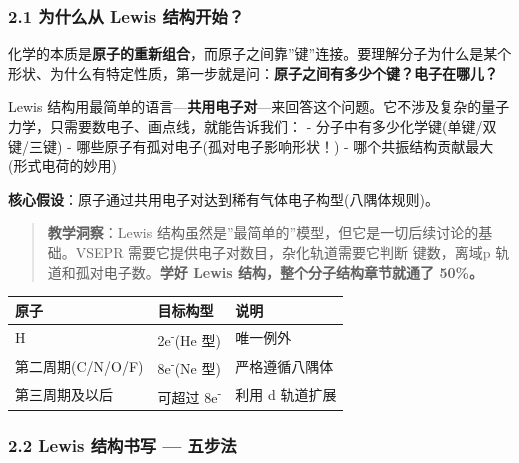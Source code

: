 \subsubsection{2.1 为什么从 Lewis 结构开始？}\label{ux4e3aux4ec0ux4e48ux4ece-lewis-ux7ed3ux6784ux5f00ux59cb}

化学的本质是\textbf{原子的重新组合}，而原子之间靠''键''连接。要理解分子为什么是某个形状、为什么有特定性质，第一步就是问：\textbf{原子之间有多少个键？电子在哪儿？}

Lewis 结构用最简单的语言---\textbf{共用电子对}---来回答这个问题。它不涉及复杂的量子力学，只需要数电子、画点线，就能告诉我们：
- 分子中有多少化学键(单键/双键/三键)
- 哪些原子有孤对电子(孤对电子影响形状！)
- 哪个共振结构贡献最大(形式电荷的妙用)

\textbf{核心假设}：原子通过共用电子对达到稀有气体电子构型(八隅体规则)。

\begin{quote}
\textbf{教学洞察}：Lewis 结构虽然是''最简单的''模型，但它是一切后续讨论的基础。VSEPR 需要它提供电子对数目，杂化轨道需要它判断  键数，离域 p 轨道和孤对电子数。\textbf{学好 Lewis 结构，整个分子结构章节就通了 50\%。}
\end{quote}

{\def\LTcaptype{none} %
\begin{longtable}[]{@{}lll@{}}
\toprule\noalign{}
原子 & 目标构型 & 说明 \\
\midrule\noalign{}
\endhead
\bottomrule\noalign{}
\endlastfoot
H & 2e\textsuperscript{-}(He 型) & 唯一例外 \\
第二周期(C/N/O/F) & 8e\textsuperscript{-}(Ne 型) & 严格遵循八隅体 \\
第三周期及以后 & 可超过 8e\textsuperscript{-} & 利用 d 轨道扩展 \\
\end{longtable}
}

\subsubsection{2.2 Lewis 结构书写 --- 五步法}\label{lewis-ux7ed3ux6784ux4e66ux5199-ux4e94ux6b65ux6cd5}

\begin{Shaded}
\begin{Highlighting}[]




\end{Highlighting}
\end{Shaded}

